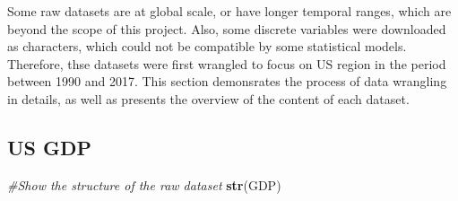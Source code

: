 \documentclass[12pt,]{article}
\newenvironment{Shaded}{\begin{snugshade}}{\end{snugshade}}
\newcommand{\KeywordTok}[1]{\textcolor[rgb]{0.13,0.29,0.53}{\textbf{#1}}}
\newcommand{\CommentTok}[1]{\textcolor[rgb]{0.56,0.35,0.01}{\textit{#1}}}
\newcommand{\NormalTok}[1]{#1}
\begin{document}
Some raw datasets are at global scale, or have longer temporal ranges,
which are beyond the scope of this project. Also, some discrete
variables were downloaded as characters, which could not be compatible
by some statistical models. Therefore, thse datasets were first wrangled
to focus on US region in the period between 1990 and 2017. This section
demonsrates the process of data wrangling in details, as well as
presents the overview of the content of each dataset.

\subsection{US GDP}\label{us-gdp}

\begin{Shaded}
\begin{Highlighting}[]
\CommentTok{#Show the structure of the raw dataset}
\KeywordTok{str}\NormalTok{(GDP)}
\end{Highlighting}
\end{Shaded}
\end{document}
